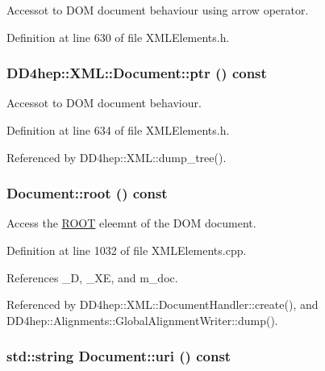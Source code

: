 Accessot to DOM document behaviour using arrow operator. 

Definition at line 630 of file XMLElements.h.\hypertarget{class_d_d4hep_1_1_x_m_l_1_1_document_a6b98d5a28e0e8b7310829a800ac74157}{
\subsubsection[{ptr}]{ DD4hep::XML::Document::ptr () const}}
\label{class_d_d4hep_1_1_x_m_l_1_1_document_a6b98d5a28e0e8b7310829a800ac74157}


Accessot to DOM document behaviour. 

Definition at line 634 of file XMLElements.h.

Referenced by DD4hep::XML::dump\_\-tree().\hypertarget{class_d_d4hep_1_1_x_m_l_1_1_document_a47d622c2e7c92089b4b7feb230154be4}{
\subsubsection[{root}]{ Document::root () const}}
\label{class_d_d4hep_1_1_x_m_l_1_1_document_a47d622c2e7c92089b4b7feb230154be4}


Access the \hyperlink{namespace_r_o_o_t}{ROOT} eleemnt of the DOM document. 

Definition at line 1032 of file XMLElements.cpp.

References \_\-D, \_\-XE, and m\_\-doc.

Referenced by DD4hep::XML::DocumentHandler::create(), and DD4hep::Alignments::GlobalAlignmentWriter::dump().\hypertarget{class_d_d4hep_1_1_x_m_l_1_1_document_aff1172a369a155c730dd3217d9984c54}{
\subsubsection[{uri}]{\setlength{\rightskip}{0pt plus 5cm}std::string Document::uri () const}}
\label{class_d_d4hep_1_1_x_m_l_1_1_document_aff1172a369a155c730dd3217d9984c54}


